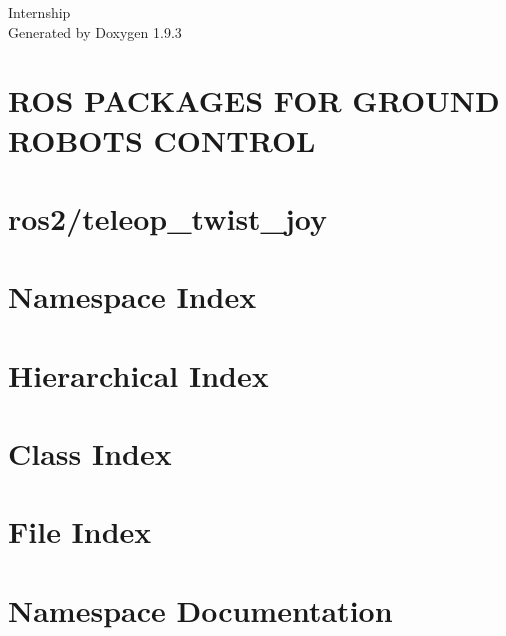 \documentclass[twoside]{book}
\newcommand{\+}{\discretionary{\mbox{\scriptsize$\hookleftarrow$}}{}{}}
\newcommand{\clearemptydoublepage}{%
    \newpage{\pagestyle{empty}\cleardoublepage}%
  }
\begin{document}
  \raggedbottom
    \hypersetup{pageanchor=false,
                bookmarksnumbered=true,
                pdfencoding=unicode
               }
  \begin{titlepage}
  \vspace*{7cm}
  \begin{center}%
  {\Large Internship}\\
  \vspace*{1cm}
  {\large Generated by Doxygen 1.9.3}\\
  \end{center}
  \end{titlepage}
  \clearemptydoublepage
  \tableofcontents
  \clearemptydoublepage
  \hypersetup{pageanchor=true}
\chapter{ROS PACKAGES FOR GROUND ROBOTS CONTROL}
\label{md_README}

\chapter{ros2/teleop\+\_\+twist\+\_\+joy}
\label{md_src_teleop_twist_joy_README}

\chapter{Namespace Index}

\chapter{Hierarchical Index}

\chapter{Class Index}

\chapter{File Index}

\chapter{Namespace Documentation}















\end{document}
